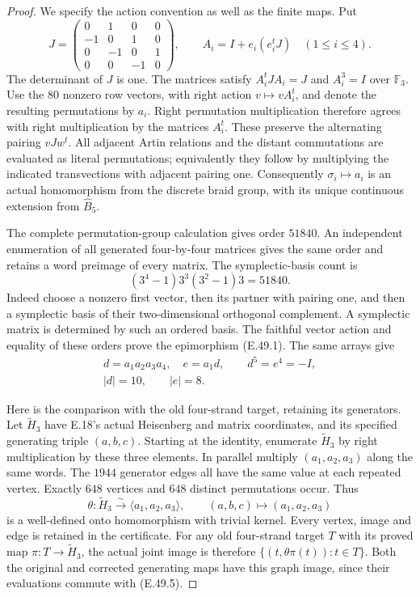 \begin{proof}
We specify the action convention as well as the finite maps.
Put
\[
 J=\begin{pmatrix}
 0&1&0&0\\-1&0&1&0\\0&-1&0&1\\0&0&-1&0
 \end{pmatrix},\qquad
 A_i=I+e_i(e_i^tJ)\quad(1\leq i\leq4).
 \tag{E.49.2}
\]
The determinant of $J$ is one.  The matrices satisfy
$A_i^tJA_i=J$ and $A_i^3=I$ over $\mathbb F_3$.
Use the $80$ nonzero row vectors, with right action
$v\mapsto vA_i^t$, and denote the resulting permutations by
$a_i$.  Right permutation multiplication therefore agrees
with right multiplication by the matrices $A_i^t$.
These preserve the alternating pairing $vJw^t$.
All adjacent Artin relations and the distant commutations
are evaluated as literal permutations; equivalently they follow
by multiplying the indicated transvections with adjacent pairing
one.  Consequently $\sigma_i\mapsto a_i$ is an actual
homomorphism from the discrete braid group, with its unique
continuous extension from $\widehat B_5$.

The complete permutation-group calculation gives order
$51840$.  An independent enumeration of all generated
four-by-four matrices gives the same order and retains a
word preimage of every matrix.  The symplectic-basis count is
\[
              (3^4-1)3^3(3^2-1)3=51840.
 \tag{E.49.3}
\]
Indeed choose a nonzero first vector, then its partner with
pairing one, and then a symplectic basis of their two-dimensional
orthogonal complement.  A symplectic matrix is determined by
such an ordered basis.  The faithful vector action and equality
of these orders prove the epimorphism \textup{(E.49.1)}.
The same arrays give
\[
 \begin{gathered}
 d=a_1a_2a_3a_4,\quad e=a_1d,\qquad
 d^5=e^4=-I,\\
 |d|=10,\qquad |e|=8.
 \end{gathered}
 \tag{E.49.4}
\]

Here is the comparison with the old four-strand target, retaining
its generators.  Let $\widetilde H_3$ have E.18's actual
Heisenberg and matrix coordinates, and its specified generating
triple $(a,b,c)$.  Starting at the identity, enumerate
$\widetilde H_3$ by right multiplication by these three elements.
In parallel multiply $(a_1,a_2,a_3)$ along the same words.
The $1944$ generator edges all have the same value at each
repeated vertex.  Exactly $648$ vertices and $648$ distinct
permutations occur.  Thus
\[
 \theta:\widetilde H_3\xrightarrow{\sim}
       \langle a_1,a_2,a_3\rangle,\qquad
       (a,b,c)\longmapsto(a_1,a_2,a_3)
 \tag{E.49.5}
\]
is a well-defined onto homomorphism with trivial kernel.
Every vertex, image and edge is retained in the certificate.
For any old four-strand target $T$ with its proved map
$\pi:T\to\widetilde H_3$, the actual joint image is therefore
$\{(t,\theta\pi(t)):t\in T\}$.  Both the original and corrected
generating maps have this graph image, since their evaluations
commute with \textup{(E.49.5)}.


\end{proof}
